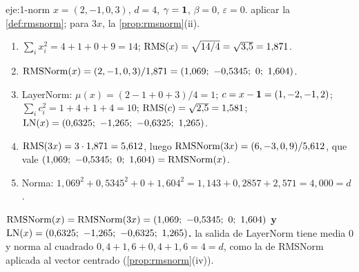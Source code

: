 \begin{solucion}{eje:1-norm}
\datos $x=(2,-1,0,3)$, $d=4$, $\gamma=\mathbf{1}$, $\beta=0$, $\varepsilon=0$.
\planteamiento aplicar la \cref{def:rmsnorm}; para $3x$, la \cref{prop:rmsnorm}(ii).
\pasos
\begin{enumerate}[label=\arabic*.]
  \item $\sum_i x_i^{2}=4+1+0+9=14$; $\operatorname{RMS}(x)=\sqrt{14/4}=\sqrt{3{,}5}=1{,}871$.
  \item $\RMSNorm(x)=(2,-1,0,3)/1{,}871=(1{,}069;\ -0{,}5345;\ 0;\ 1{,}604)$.
  \item LayerNorm: $\mu(x)=(2-1+0+3)/4=1$; $c=x-\mathbf{1}=(1,-2,-1,2)$; $\sum_i c_i^{2}=1+4+1+4=10$; $\operatorname{RMS}(c)=\sqrt{2{,}5}=1{,}581$; $\LN(x)=(0{,}6325;\ -1{,}265;\ -0{,}6325;\ 1{,}265)$.
  \item $\operatorname{RMS}(3x)=3\cdot 1{,}871=5{,}612$, luego $\operatorname{RMSNorm}(3x)=(6,-3,0,9)/5{,}612$, que vale $(1{,}069;\ -0{,}5345;\ 0;\ 1{,}604)=\RMSNorm(x)$.
  \item Norma: $1{,}069^{2}+0{,}5345^{2}+0+1{,}604^{2}=1{,}143+0{,}2857+2{,}571=4{,}000=d$.
\end{enumerate}
\resultado \textbf{$\RMSNorm(x)=\RMSNorm(3x)=(1{,}069;\ -0{,}5345;\ 0;\ 1{,}604)$ y $\LN(x)=(0{,}6325;\ -1{,}265;\ -0{,}6325;\ 1{,}265)$.}
\comprobacion la salida de LayerNorm tiene media $0$ y norma al cuadrado $0{,}4+1{,}6+0{,}4+1{,}6=4=d$, como la de RMSNorm aplicada al vector centrado (\cref{prop:rmsnorm}(iv)).
\end{solucion}

